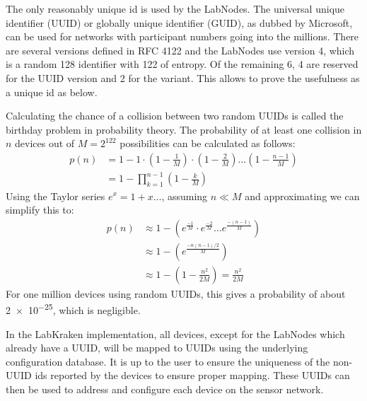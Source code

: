 The only reasonably unique id is used by the LabNodes. The universal unique identifier (UUID) or globally unique identifier (GUID), as dubbed by Microsoft, can be used for networks with participant numbers going into the millions. There are several versions defined in RFC 4122 \cite{rfc_uuid} and the LabNodes use version 4, which is a random \qty{128}{\bit} identifier with \qty{122}{\bit} of entropy. Of the remaining \qty{6}{\bit}, \qty{4}{\bit} are reserved for the UUID version and \qty{2}{\bit} for the variant. This allows to prove the usefulness as a unique id as below.

Calculating the chance of a collision between two random UUIDs is called the birthday problem \cite{BirthdayProblem} in probability theory. The probability of at least one collision in $n$ devices out of $M = 2^{122}$ possibilities can be calculated as follows:
\begin{align}
    p(n) &= 1 - 1 \cdot \left(1 - \frac{1}{M}\right) \cdot \left(1 - \frac{2}{M}\right) \dots \left(1 - \frac{n-1}{M}\right) \nonumber\\
    &= 1 - \prod_{k=1}^{n-1} \left(1 - \frac{k}{M} \right)
\end{align}
Using the Taylor series $e^x = 1+x \dots$, assuming $n \ll M$ and approximating we can simplify this to:
\begin{align}
    p(n) &\approx 1 - \left(e^\frac{-1}{M} \cdot e^\frac{-2}{M} \dots e^\frac{-(n-1)}{M} \right) \nonumber\\
    &\approx 1 - \left(e^\frac{-n(n-1)/2}{M} \right) \nonumber\\
    &\approx 1 - \left(1 - \frac{n^2}{2 M} \right) = \frac{n^2}{2 M}
\end{align}
For one million devices using random UUIDs, this gives a probability of about \num{2e-25}, which is negligible.

In the LabKraken implementation, all devices, except for the LabNodes which already have a UUID, will be mapped to UUIDs using the underlying configuration database. It is up to the user to ensure the uniqueness of the non-UUID ids reported by the devices to ensure proper mapping. These UUIDs can then be used to address and configure each device on the sensor network.


